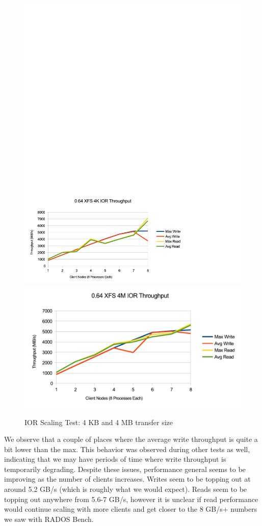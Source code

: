 \documentclass{article}
\begin{document}
\begin{figure}[htb]
\centering
\includegraphics[width=5in]{ior-064-4k}
\includegraphics[width=5in]{ior-064-4m}
\caption{IOR Scaling Test: 4 KB and 4 MB transfer size}
\label{fig:ior-064}
\end{figure}

We observe that a couple of places where the average write throughput is quite a
bit lower than the max.  This behavior was observed during other tests as well,
indicating that we may have periods of time where write throughput is
temporarily degrading.  Despite these issues, performance general seems to be
improving as the number of clients increases.  Writes seem to be topping out at
around 5.2 GB/s (which is roughly what we would expect).  Reads seem to be
topping out anywhere from 5.6-7 GB/s, however it is unclear if read performance
would continue scaling with more clients and get closer to the 8 GB/s+ numbers we
saw with RADOS Bench.
\end{document}
